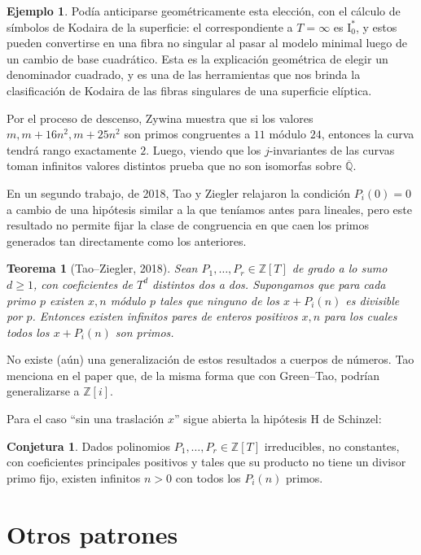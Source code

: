 \documentclass[a4paper]{book}
\theoremstyle{definition}
\newtheorem*{example*}{Ejemplo}
\newtheorem*{conjecture*}{Conjetura}
\theoremstyle{plain}
\newtheorem*{theorem*}{Teorema}
\newcommand{\QQ}{\mathbb{Q}}
\newcommand{\ZZ}{\mathbb{Z}}
\begin{document}
\begin{example*}
Podía anticiparse geométricamente esta elección, con el cálculo de símbolos de Kodaira de la superficie: el correspondiente a $T=\infty$ es $\mathrm{I}_0^*$, y estos pueden convertirse en una fibra no singular al pasar al modelo minimal luego de un cambio de base cuadrático. Esta es la explicación geométrica de elegir un denominador cuadrado, y es una de las herramientas que nos brinda la clasificación de Kodaira de las fibras singulares de una superficie elíptica.

Por el proceso de descenso, Zywina muestra que si los valores $m, m+16n^2, m+25n^2$ son primos congruentes a $11$ módulo $24$, entonces la curva tendrá rango exactamente $2$. Luego, viendo que los $j$-invariantes de las curvas toman infinitos valores distintos prueba que no son isomorfas sobre $\overline{\QQ}$.
\end{example*}

En un segundo trabajo, de 2018, Tao y Ziegler relajaron la condición $P_i(0)=0$ a cambio de una hipótesis similar a la que teníamos antes para lineales, pero este resultado no permite fijar la clase de congruencia en que caen los primos generados tan directamente como los anteriores.

\begin{theorem*}[Tao--Ziegler, 2018]
Sean $P_1,\ldots,P_r\in\ZZ[T]$ de grado a lo sumo $d\geq1$, con coeficientes de $T^d$ distintos dos a dos. Supongamos que para cada primo $p$ existen $x,n$ módulo $p$ tales que ninguno de los $x+P_i(n)$ es divisible por $p$. Entonces existen infinitos pares de enteros positivos $x,n$ para los cuales todos los $x+P_i(n)$ son primos.
\end{theorem*}

No existe (aún) una generalización de estos resultados a cuerpos de números. Tao menciona en el paper que, de la misma forma que con Green--Tao, podrían generalizarse a $\ZZ[i]$.

Para el caso ``sin una traslación $x$'' sigue abierta la hipótesis H de Schinzel: 
\begin{conjecture*}
Dados polinomios $P_1,\ldots,P_r\in\ZZ[T]$ irreducibles, no constantes, con coeficientes principales positivos y tales que su producto no tiene un divisor primo fijo, existen infinitos $n>0$ con todos los $P_i(n)$ primos. 
\end{conjecture*}

\section{Otros patrones}
\end{document}
